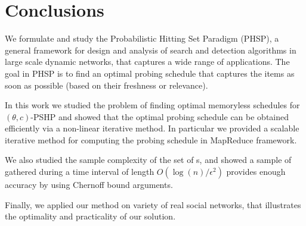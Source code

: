 \section{Conclusions}\label{sec:concl}
We formulate and study the Probabilistic Hitting Set Paradigm (PHSP),
a general framework for design and analysis of search and detection algorithms
in large scale dynamic networks, that  captures a wide range of applications. The goal in PHSP is to find an optimal probing schedule that captures the items as soon as possible (based on their freshness or relevance).

In this work we studied the problem of finding optimal memoryless schedules for $(\theta,c)$-PSHP and showed that the optimal probing schedule can be obtained efficiently via a non-linear iterative method. In particular we provided a scalable iterative method for computing the probing schedule in MapReduce framework.

We also studied the sample complexity of the set of {\ins}s, and showed a sample of {\ins} gathered during a time interval of length $O(\log(n)/\epsilon^2)$ provides enough accuracy by using Chernoff bound arguments.

Finally, we applied our method on variety of real social networks, that illustrates the optimality and practicality of our solution.

